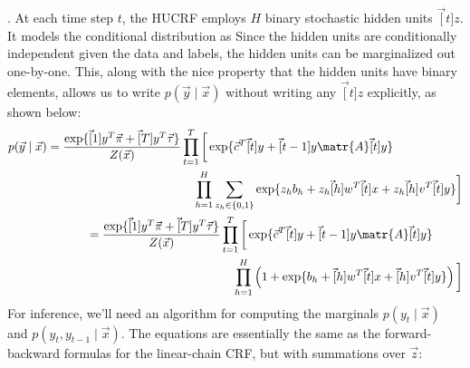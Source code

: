 \documentclass[11pt]{article}
\begin{document}
\myspace
\p {}. At each time step $t$, the HUCRF employs $H$ binary stochastic hidden units $\vec[t]{z}$. It models the conditional distribution as 
Since the hidden units are conditionally independent given the data and labels, the hidden units can be marginalized out one-by-one. This, along with the nice property that the hidden units have binary elements, allows us to write $p(\vec y \mid \vec x)$ without writing any $\vec[t]{z}$ explicitly, as shown below:
\begin{align}
\begin{split}
p(\vec y \mid \vec x) 
= \frac{ \exp\{\vec[1]{y}^T \vec{\pi} + \vec[T]{y}^T \vec{\tau} \} }{ Z(\vec x) }
&\prod_{t=1}^{T}\bigg[ 
\exp\{ \vec{c}^T \vec[t]{y} + \vec[t-1]{y}\matr{A}\vec[t]{y}   \}           \\
&\quad \prod_{h = 1}^{H} \sum_{z_h \in \{0, 1\}} \exp\{ z_h b_h + z_h \vec[h]{w}^T \vec[t]{x} + z_h \vec[h]{v}^T \vec[t]{y}  \}	\bigg]
\end{split}\\
\begin{split}
= \frac{ \exp\{\vec[1]{y}^T \vec{\pi} + \vec[T]{y}^T \vec{\tau} \} }{ Z(\vec x) }
&\prod_{t=1}^{T}\bigg[ 
\exp\{ \vec{c}^T \vec[t]{y} + \vec[t-1]{y}\matr{A}\vec[t]{y}   \}           \\
&\quad \prod_{h = 1}^{H} \left( 1 + \exp\{ b_h + \vec[h]{w}^T \vec[t]{x} + \vec[h]{v}^T \vec[t]{y}  \} \right)	\bigg]
\end{split}
\end{align}
For inference, we'll need an algorithm for computing the marginals $p(y_t \mid \vec x)$ and $p(y_t, y_{t - 1} \mid \vec x)$. The equations are essentially the same as the forward-backward formulas for the linear-chain CRF, but with summations over $\vec z$:
\end{document}
